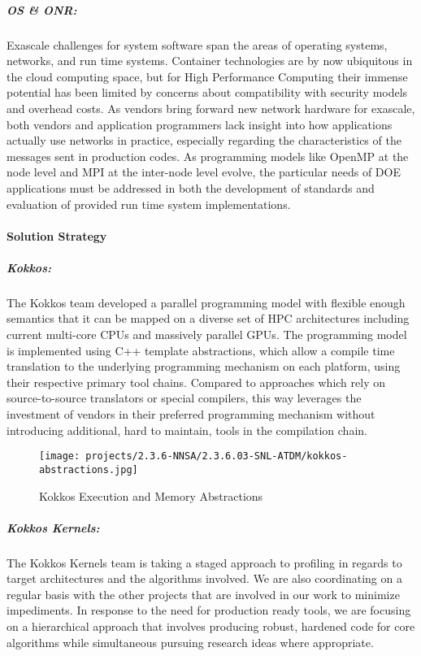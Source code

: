 \subparagraph{OS \& ONR:} Exascale challenges for system software span the areas of operating systems, networks, and run time systems.  Container technologies are by now ubiquitous in the cloud computing space, but for High Performance Computing their immense potential has been limited by concerns about compatibility with security models and overhead costs.  As vendors bring forward new network hardware for exascale, both vendors and application programmers lack insight into how applications actually use networks in practice, especially regarding the characteristics of the messages sent in production codes.  As programming models like OpenMP at the node level and MPI at the inter-node level evolve, the particular needs of DOE applications must be addressed in both the development of standards and evaluation of provided run time system implementations.



\paragraph{Solution Strategy}

\subparagraph{Kokkos: } The Kokkos team developed a parallel programming model with flexible enough semantics that it can be mapped on a diverse set of HPC architectures including current multi-core CPUs and massively parallel GPUs.
The programming model is implemented using C++ template abstractions, which allow a compile time translation to the underlying programming mechanism on each platform, using their respective primary tool chains.
Compared to approaches which rely on source-to-source translators or special compilers, this way leverages the investment of vendors in their preferred programming mechanism without introducing additional, hard to maintain, tools in the compilation chain.

\begin{figure}[ht!]
\centering
\texttt{[image: projects/2.3.6-NNSA/2.3.6.03-SNL-ATDM/kokkos-abstractions.jpg]}
\caption{Kokkos Execution and Memory Abstractions}
\end{figure}

\subparagraph{Kokkos Kernels:} The Kokkos Kernels team is taking a staged approach to profiling in regards to target architectures and the algorithms involved. We are also coordinating on a regular basis with the other projects that are involved in our work to minimize impediments. In response to the need for production ready tools, we are focusing on a hierarchical approach that involves producing robust, hardened code for core algorithms while simultaneous pursuing research ideas where appropriate. 
 
